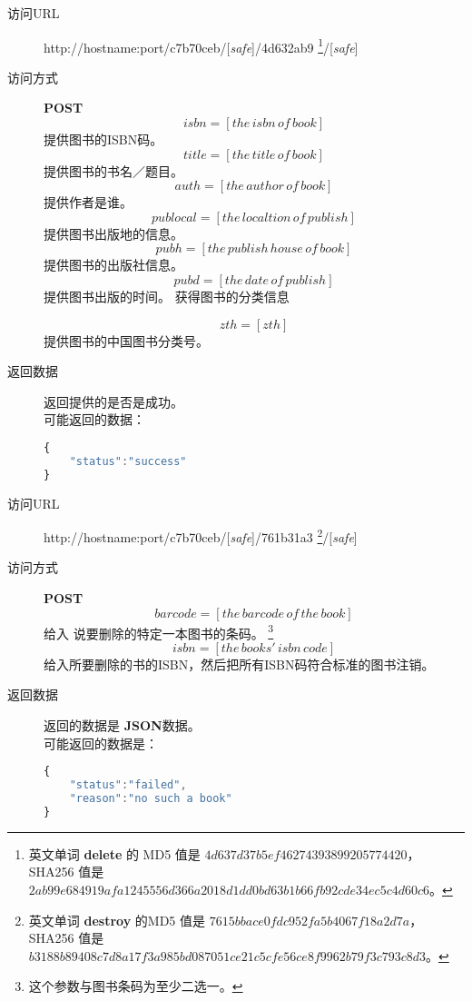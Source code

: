 \documentclass[UTF8]{article}
\def\safe{/[\textit{safe}]}
\def\POST{\colorbox[rgb]{0.77,0.53,0.97}{\textbf{POST}}}
\def\bfJSON{\textbf{JSON}\space}
\def\viaurl{\item[{\quad\colorbox[rgb]{0.47,0.88,0.89}{访问URL}}]}
\def\viareq#1{\item[{\quad\colorbox[rgb]{0.57,0.88,0.99}{访问方式}}] #1}
\def\rtdata{\item[{\quad\colorbox[rgb]{0.70,0.9,0.59}{返回数据}}]}
\begin{document}
        \begin{description}
        \viaurl http://hostname:port/c7b70ceb\safe/4d632ab9
        \footnote{
            英文单词 \textbf{delete} 的
            MD5 值是 $4d637d37b5ef46274393899205774420$，
            SHA256 值是 $2ab99e684919afa1245556d366a2018d1dd0bd63b1b66fb92cde34ec5c4d60c6$。
        }\safe
        \viareq{\POST}
        $$isbn=[the\,isbn\,of\,book]$$
        提供图书的ISBN码。
        $$title=[the\,title\,of\,book]$$
        提供图书的书名／题目。
        $$auth=[the\,author\,of\,book]$$
        提供作者是谁。
        $$publocal=[the\,localtion\,of\,publish]$$
        提供图书出版地的信息。
        $$pubh=[the\,publish\,house\,of\,book]$$
        提供图书的出版社信息。
        $$pubd=[the\,date\,of\,publish]$$
        提供图书出版的时间。
         获得图书的分类信息

        $$zth=[zth]$$
        提供图书的中国图书分类号。
        \rtdata 返回提供的是否是成功。
	    	\\ 可能返回的数据：
        \begin{lstlisting}[language=JavaScript]
{
    "status":"success"
}
		\end{lstlisting}
        \end{description}
        \begin{description}
		\viaurl http://hostname:port/c7b70ceb\safe/761b31a3
        \footnote{
            英文单词 \textbf{destroy} 的MD5 值是
            $7615bbace0fdc952fa5b4067f18a2d7a$，
            SHA256 值是
            $b3188b89408c7d8a17f3a985bd087051ce21c5cfe56ce8f9962b79f3c793c8d3$。
        }\safe
        \viareq{\POST}
        				$$barcode=[the\,barcode\,of\,the\,book]$$
          给入 说要删除的特定一本图书的条码。
        \footnote{这个参数与图书条码为至少二选一。}
          $$isbn=[the\,books'\,isbn\,code]$$
          给入所要删除的书的ISBN，然后把所有ISBN码符合标准的图书注销。
        \rtdata 返回的数据是 \bfJSON 数据。
        \\ 可能返回的数据是：
        \begin{lstlisting}[language=JavaScript]
{
    "status":"failed",
    "reason":"no such a book"
}
        \end{lstlisting}
        \end{description}
\end{document}
